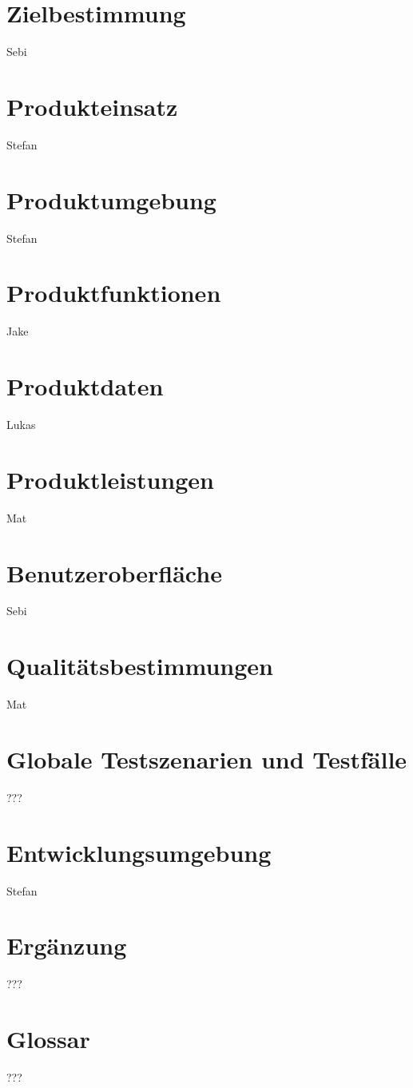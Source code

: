 \documentclass[a4paper, ngerman]{report}
\newcommand{\sepauthor}[1]{\vspace{-5.6em}\begin{flushright}#1\end{flushright}}
\begin{document}
\tableofcontents

\chapter{Zielbestimmung} \sepauthor{Sebi}


\chapter{Produkteinsatz} \sepauthor{Stefan}


\chapter{Produktumgebung} \sepauthor{Stefan}


\chapter{Produktfunktionen} \sepauthor{Jake}


\chapter{Produktdaten} \sepauthor{Lukas}


\chapter{Produktleistungen} \sepauthor{Mat}


\chapter{Benutzeroberfläche} \sepauthor{Sebi}


\chapter{Qualitätsbestimmungen} \sepauthor{Mat}


\chapter{Globale Testszenarien und Testfälle} \sepauthor{???}


\chapter{Entwicklungsumgebung} \sepauthor{Stefan}


\chapter{Ergänzung} \sepauthor{???}


\chapter{Glossar} \sepauthor{???}

\end{document}
